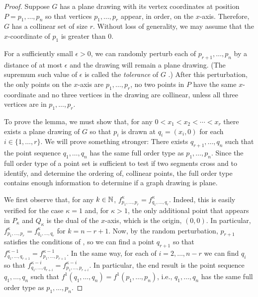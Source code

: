 \documentclass{patmorin}
\begin{document}
\begin{proof}
   Suppose $G$ has a plane drawing with its vertex coordinates at position
   $P=p_1,\ldots,p_n$ so that vertices $p_1,\ldots,p_r$ appear, in order,
   on the $x$-axis.  Therefore, $G$ has a collinear set of size $r$.
   Without loss of generality, we may assume that the $x$-coordinate of
   $p_1$ is greater than 0.

   For a sufficiently small $\epsilon>0$, we can randomly perturb each
   of $p_{r+1},\ldots,p_n$ by a distance of at most $\epsilon$ and
   the drawing will remain a plane drawing. (The supremum such value of
   $\epsilon$ is called the \emph{tolerance} of $G$ \cite{X}.)  After this
   perturbation, the only points on the $x$-axis are $p_1,\ldots,p_r$,
   no two points in $P$ have the same $x$-coordinate and no three
   vertices in the drawing are collinear, unless all three vertices are
   in $p_1,\ldots,p_r$.

   To prove the lemma, we must show that, for any $0<x_1<x_2<\cdots<x_r$
   there exists a plane drawing of $G$ so that $p_i$ is drawn at
   $q_i=(x_i,0)$ for each $i\in\{1,\ldots,r\}$.  We will prove
   something stronger: There exists $q_{r+1},\ldots,q_n$ such that
   the point sequence $q_1,\ldots,q_n$ has the same full order type
   as $p_1,\ldots,p_n$. Since the full order type of a point set
   is sufficient to test if two segments cross and to identify, and
   determine the ordering of, collinear points, the full order type
   contains enough information to determine if a graph drawing is plane.

   We first observe that, for any $k\in\mathbb{N}$,
   $f^{\kappa}_{p_1,\ldots,p_r}=f^{\kappa}_{q_1,\ldots,q_r}$.  Indeed,
   this is easily verified for the case $\kappa=1$ and, for $\kappa>1$,
   the only additional point that appears in $P_\kappa$ and $Q_\kappa$ is
   the dual of the $x$-axis, which is the origin, $(0,0)$.  In particular,
   $f^{\kappa}_{p_1,\ldots,p_r}=f^{\kappa}_{q_1,\ldots,q_r}$ for
   $k=n-r+1$.  Now, by the random perturbation, $p_{r+1}$ satisfies the
   conditions of , so we can find a point $q_{r+1}$ so that
   $f^{\kappa-1}_{q_1,\ldots,q_{r+1}}=f^{\kappa-1}_{p_1,\ldots,p_{r+1}}$.
   In the same way, for each of $i=2,\ldots,n-r$ we can
   find $q_i$ so that $f^{\kappa-i}_{q_1,\ldots,q_{r+i}} =
   f^{\kappa-i}_{p_1,\ldots,p_{r+i}}$.  In particular, the
   end result is the point sequence $q_1,\ldots,q_n$ such that
   $f^{1}(q_1,\ldots,q_n)=f^{1}(p_1,\ldots,p_n)$, i.e., $q_1,\ldots,q_n$
   has the same full order type as $p_1,\ldots,p_n$.
\end{proof}
\end{document}

